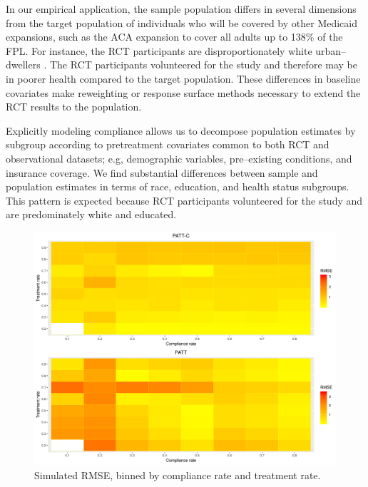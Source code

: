 \documentclass[hidelinks,12pt]{article}
\begin{document}
{In our empirical application, the sample population differs in several dimensions from the target population of individuals who will be covered by other Medicaid expansions, such as the ACA expansion to cover all adults up to 138\% of the FPL. For instance, the RCT participants are disproportionately white urban--dwellers \citep{Taubman}. The RCT participants volunteered for the study and therefore may be in poorer health compared to the target population. These differences in baseline covariates make {\color{red}reweighting or response surface methods} necessary to extend the RCT results to the population.

Explicitly modeling compliance allows us to decompose population estimates by subgroup according to pretreatment covariates common to both RCT and observational datasets{\color{red}; e.g, demographic variables, pre--existing conditions, and insurance coverage}. We find substantial differences between sample and population estimates in terms of race, education, and health status subgroups. This pattern is expected because RCT participants volunteered for the study and are predominately white and educated.

\pagebreak

\printbibliography


\pagebreak
\begin{appendices}
	
\newcommand{\hbAppendixPrefix}{A}
%
\renewcommand{\thefigure}{\hbAppendixPrefix\arabic{figure}}
\setcounter{figure}{0}
\renewcommand{\thetable}{\hbAppendixPrefix\arabic{table}} 
\setcounter{table}{0}
\renewcommand{\theequation}{\hbAppendixPrefix\arabic{equation}} 
\setcounter{equation}{0}


\begin{figure}[htbp]
	\begin{center}
		\includegraphics[width = 1\textwidth]{rmse_ratec_ratet}
		\caption{Simulated RMSE, binned by compliance rate and treatment rate. \label{fig:rmse_ratec_ratet}}
	\end{center}
\end{figure}


\end{appendices}}
\end{document}
